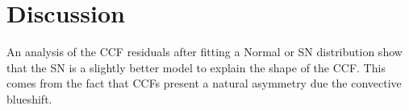 \documentclass[11pt, oneside]{article}
\begin{document}


\section{Discussion} \label{sec:discu}

An analysis of the CCF residuals after fitting a Normal or SN distribution show that the SN is a slightly better model to explain the shape of the CCF. This comes from the fact that CCFs present a natural asymmetry due the convective blueshift.
\end{document}

